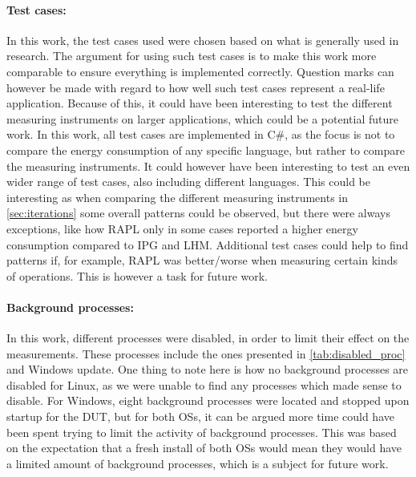\paragraph*{Test cases:} In this work, the test cases used were chosen based on what is generally used in research\cite[]{Koedijk2022diff, greenland2016statistical}. The argument for using such test cases is to make this work more comparable to ensure everything is implemented correctly. Question marks can however be made with regard to how well such test cases represent a real-life application. Because of this, it could have been interesting to test the different measuring instruments on larger applications, which could be a potential future work. In this work, all test cases are implemented in C\#, as the focus is not to compare the energy consumption of any specific language, but rather to compare the measuring instruments. It could however have been interesting to test an even wider range of test cases, also including different languages. This could be interesting as when comparing the different measuring instruments in \cref{sec:iterations} some overall patterns could be observed, but there were always exceptions, like how RAPL only in some cases reported a higher energy consumption compared to IPG and LHM. Additional test cases could help to find patterns if, for example, RAPL was better/worse when measuring certain kinds of operations. This is however a task for future work.  

\paragraph*{Background processes:} In this work, different processes were disabled, in order to limit their effect on the measurements. These processes include the ones presented in \cref{tab:disabled_proc} and Windows update. One thing to note here is how no background processes are disabled for Linux, as we were unable to find any processes which made sense to disable. For Windows, eight background processes were located and stopped upon startup for the DUT, but for both OSs, it can be argued more time could have been spent trying to limit the activity of background processes. This was based on the expectation that a fresh install of both OSs would mean they would have a limited amount of background processes, which is a subject for future work. 


